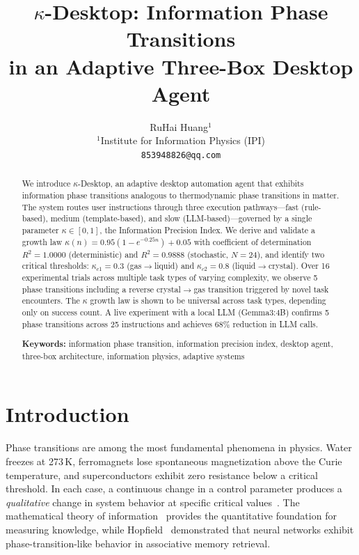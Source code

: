\documentclass[10pt,twocolumn]{article}
\title{%
  \Large $\kappa$-Desktop: Information Phase Transitions \\
  in an Adaptive Three-Box Desktop Agent
}
\author{
  RuHai Huang$^{1}$ \\[4pt]
  {\small $^{1}$Institute for Information Physics (IPI)} \\
  {\small \texttt{853948826@qq.com}}
}
\date{}
\newcommand{\kap}{\kappa}
\newcommand{\kdes}{$\kappa$-Desktop}
\begin{document}
\maketitle
\thispagestyle{empty}

\begin{abstract}
\noindent
We introduce \kdes{}, an adaptive desktop automation agent 
that exhibits information phase transitions analogous to 
thermodynamic phase transitions in matter. The system routes 
user instructions through three execution pathways---fast 
(rule-based), medium (template-based), and slow 
(LLM-based)---governed by a single parameter 
$\kap \in [0,1]$, the Information Precision Index. We derive 
and validate a growth law $\kap(n) = 0.95(1-e^{-0.25n}) + 0.05$ 
with coefficient of determination $R^2 = 1.0000$ 
(deterministic) and $R^2 = 0.9888$ (stochastic, 
$N=24$), and identify 
two critical thresholds: $\kap_{c1} = 0.3$ 
(gas$\rightarrow$liquid) and $\kap_{c2} = 0.8$ 
(liquid$\rightarrow$crystal). Over 16 experimental trials 
across multiple task types of varying complexity, we observe 
5 phase transitions including a reverse 
crystal$\rightarrow$gas transition triggered by novel task 
encounters. The $\kap$ growth law is shown to be universal 
across task types, depending only on success count. A live experiment with a local LLM (Gemma3:4B) 
confirms 5 phase transitions across 25 instructions 
and achieves 68\% reduction in LLM calls.

\medskip
\noindent\textbf{Keywords:} information phase transition, 
information precision index, desktop agent, three-box 
architecture, information physics, adaptive systems
\end{abstract}

\section{Introduction}

Phase transitions are among the most fundamental phenomena 
in physics. Water freezes at 273\,K, ferromagnets lose 
spontaneous magnetization above the Curie temperature, and 
superconductors exhibit zero resistance below a critical 
threshold. In each case, a continuous change in a control 
parameter produces a \textit{qualitative} change in system 
behavior at specific critical values~\cite{landau1937, 
goldenfeld1992}. The mathematical theory of information~\cite{shannon1948} 
provides the quantitative foundation for measuring knowledge, 
while Hopfield~\cite{hopfield1982} demonstrated that neural 
networks exhibit phase-transition-like behavior in 
associative memory retrieval.
\end{document}
